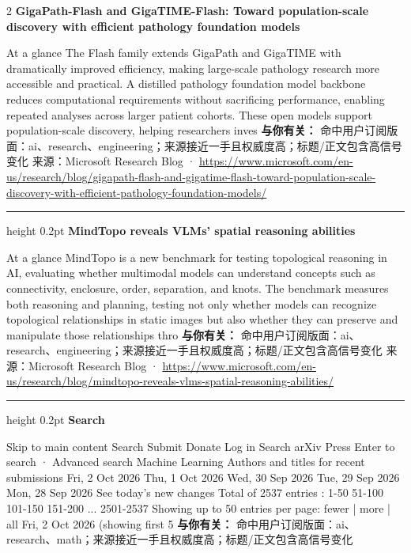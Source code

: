 \documentclass[10.5pt]{ctexart}
\begin{document}
\begin{multicols}{2}
{\large\bfseries GigaPath-Flash and GigaTIME-Flash: Toward population-scale discovery with efficient pathology foundation models}\par
At a glance The Flash family extends GigaPath and GigaTIME with dramatically improved efficiency, making large-scale pathology research more accessible and practical. A distilled pathology foundation model backbone reduces computational requirements without sacrificing performance, enabling repeated analyses across larger patient cohorts. These open models support population-scale discovery, helping researchers inves
\textbf{与你有关：} 命中用户订阅版面：ai、research、engineering；来源接近一手且权威度高；标题/正文包含高信号变化
{\footnotesize\color{ormuted} 来源：Microsoft Research Blog · \url{https://www.microsoft.com/en-us/research/blog/gigapath-flash-and-gigatime-flash-toward-population-scale-discovery-with-efficient-pathology-foundation-models/}}
\vspace{2mm}
\hrule height 0.2pt
\vspace{2mm}
{\large\bfseries MindTopo reveals VLMs’ spatial reasoning abilities}\par
At a glance MindTopo is a new benchmark for testing topological reasoning in AI, evaluating whether multimodal models can understand concepts such as connectivity, enclosure, order, separation, and knots. The benchmark measures both reasoning and planning, testing not only whether models can recognize topological relationships in static images but also whether they can preserve and manipulate those relationships thro
\textbf{与你有关：} 命中用户订阅版面：ai、research、engineering；来源接近一手且权威度高；标题/正文包含高信号变化
{\footnotesize\color{ormuted} 来源：Microsoft Research Blog · \url{https://www.microsoft.com/en-us/research/blog/mindtopo-reveals-vlms-spatial-reasoning-abilities/}}
\vspace{2mm}
\hrule height 0.2pt
\vspace{2mm}
{\large\bfseries Search}\par
Skip to main content Search Submit Donate Log in Search arXiv Press Enter to search · Advanced search Machine Learning Authors and titles for recent submissions Fri, 2 Oct 2026 Thu, 1 Oct 2026 Wed, 30 Sep 2026 Tue, 29 Sep 2026 Mon, 28 Sep 2026 See today's new changes Total of 2537 entries : 1-50 51-100 101-150 151-200 ... 2501-2537 Showing up to 50 entries per page: fewer | more | all Fri, 2 Oct 2026 (showing first 5
\textbf{与你有关：} 命中用户订阅版面：ai、research、math；来源接近一手且权威度高；标题/正文包含高信号变化

\end{multicols}
\end{document}
